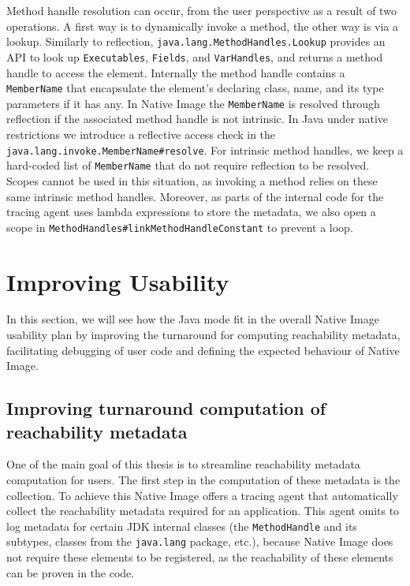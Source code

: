 Method handle resolution can occur, from the user perspective as a result of two operations. A first way is to dynamically invoke a method, the other way is via a lookup.
Similarly to reflection, \verb|java.lang.MethodHandles.Lookup| provides an API to look up \verb|Executables|, \verb|Fields|, and \verb|VarHandles|, and returns a method handle to access the element. Internally the method handle contains a \verb|MemberName| that encapsulate the element's declaring class, name, and its type parameters if it has any. 
In Native Image the \verb|MemberName| is resolved through reflection if the associated method handle is not intrinsic. In Java under native restrictions we introduce a reflective access check in the \verb|java.lang.invoke.MemberName#resolve|. 
For intrinsic method handles, we keep a hard-coded list of \verb|MemberName| that do not require reflection to be resolved. Scopes cannot be used in this situation, as invoking a method relies on these same intrinsic method handles.
Moreover, as parts of the internal code for the tracing agent uses lambda expressions to store the metadata, we also open a scope in \verb|MethodHandles#linkMethodHandleConstant| to prevent a loop.


\section{Improving Usability}
In this section, we will see how the Java mode fit in the overall Native Image usability plan by improving the turnaround for computing reachability metadata, facilitating debugging of user code and defining the expected behaviour of Native Image. 

\subsection{Improving turnaround computation of reachability metadata}
One of the main goal of this thesis is to streamline reachability metadata computation for users.
The first step in the computation of these metadata is the collection. To achieve this Native Image offers a tracing agent that automatically collect the reachability metadata required for an application. This agent omits to log metadata for certain JDK internal classes (the \verb|MethodHandle| and its subtypes, classes from the \verb|java.lang| package, etc.), because Native Image does not require these elements to be registered, as the reachability of these elements can be proven in the code.  

